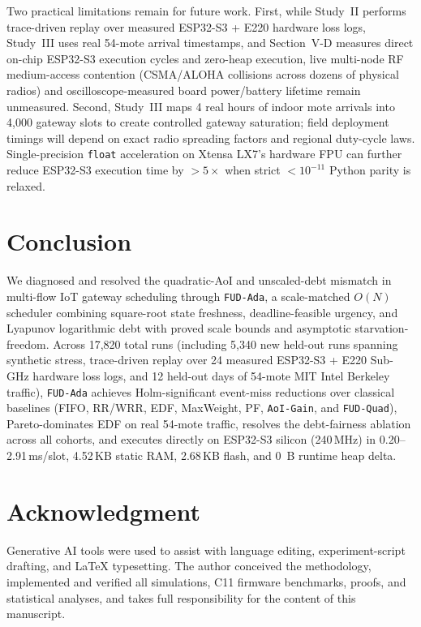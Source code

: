 \documentclass[journal]{IEEEtran}
\begin{document}
Two practical limitations remain for future work. First, while Study~II performs trace-driven replay over measured ESP32-S3 + E220 hardware loss logs, Study~III uses real 54-mote arrival timestamps, and Section~V-D measures direct on-chip ESP32-S3 execution cycles and zero-heap execution, live multi-node RF medium-access contention (CSMA/ALOHA collisions across dozens of physical radios) and oscilloscope-measured board power/battery lifetime remain unmeasured. Second, Study~III maps 4 real hours of indoor mote arrivals into 4,000 gateway slots to create controlled gateway saturation; field deployment timings will depend on exact radio spreading factors and regional duty-cycle laws. Single-precision \texttt{float} acceleration on Xtensa LX7's hardware FPU can further reduce ESP32-S3 execution time by $>5\times$ when strict $<10^{-11}$ Python parity is relaxed.

\section{Conclusion}
We diagnosed and resolved the quadratic-AoI and unscaled-debt mismatch in multi-flow IoT gateway scheduling through \texttt{FUD-Ada}, a scale-matched $O(N)$ scheduler combining square-root state freshness, deadline-feasible urgency, and Lyapunov logarithmic debt with proved scale bounds and asymptotic starvation-freedom. Across 17,820 total runs (including 5,340 new held-out runs spanning synthetic stress, trace-driven replay over 24 measured ESP32-S3 + E220 Sub-GHz hardware loss logs, and 12 held-out days of 54-mote MIT Intel Berkeley traffic), \texttt{FUD-Ada} achieves Holm-significant event-miss reductions over classical baselines (FIFO, RR/WRR, EDF, MaxWeight, PF, \texttt{AoI-Gain}, and \texttt{FUD-Quad}), Pareto-dominates EDF on real 54-mote traffic, resolves the debt-fairness ablation across all cohorts, and executes directly on ESP32-S3 silicon (240\,MHz) in 0.20--2.91\,ms/slot, 4.52\,KB static RAM, 2.68\,KB flash, and 0~B runtime heap delta.

\section*{Acknowledgment}
Generative AI tools were used to assist with language editing, experiment-script drafting, and \LaTeX{} typesetting. The author conceived the methodology, implemented and verified all simulations, C11 firmware benchmarks, proofs, and statistical analyses, and takes full responsibility for the content of this manuscript.



\end{document}
